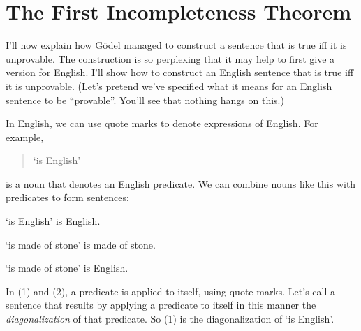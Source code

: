 
\section{The First Incompleteness Theorem}\label{sec:incompleteness}

I'll now explain how Gödel managed to construct a sentence that
is true iff it is unprovable.
The construction is so perplexing that
it may help to first give a version for English.
I'll show how to construct an English sentence that
is true iff it is unprovable.
(Let's pretend we've specified what it means for an English sentence to be ``provable''.
You'll see that nothing hangs on this.)

In English,
we can use quote marks to denote expressions of English.
For example,
\begin{quote}
  `is English'
\end{quote}
is a noun that denotes an English predicate.
We can combine nouns like this with predicates to form sentences:
\begin{cenumerate}
\item[(1)] `is English' is English.
\item[(2)] `is made of stone' is made of stone.
\item[(3)] `is made of stone' is English.
\end{cenumerate}
In (1) and (2), a predicate is applied to itself, using quote marks.
Let's call a sentence that results by applying a predicate to itself in this manner the \textit{diagonalization} of that predicate.
So (1) is the diagonalization of `is English'.

